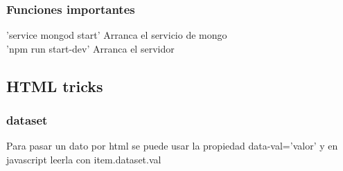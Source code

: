 \documentclass{article}
\begin{document}
        \subsubsection{Funciones importantes}
            'service mongod start' Arranca el servicio de mongo\\
            'npm run start-dev' Arranca el servidor
    \subsection{HTML tricks}
        \subsubsection{dataset}
          Para pasar un dato por html se puede usar la propiedad data-val='valor' y en javascript leerla con item.dataset.val
\end{document}
